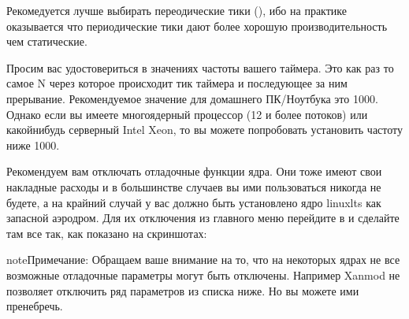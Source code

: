 \documentclass[letterpaper,10pt,russian,openany]{sphinxmanual}
\begin{document}
\sphinxAtStartPar
Рекомедуется лучше выбирать переодические тики (), ибо на практике оказывается что периодические тики
дают более хорошую производительность чем статические.

\sphinxAtStartPar
{}

\noindent{}

\sphinxAtStartPar
{}

\noindent{}

\sphinxAtStartPar
{}

\noindent{}

\sphinxAtStartPar
{}

\noindent{}

\sphinxAtStartPar
{} Просим вас удостовериться в значениях частоты вашего таймера.
Это как раз то самое N через которое происходит тик таймера и последующее за ним прерывание.
Рекомендуемое значение для домашнего ПК/Ноутбука это 1000.
Однако если вы имеете многоядерный процессор (12 и более потоков) или какой\sphinxhyphen{}нибудь серверный Intel Xeon,
то вы можете попробовать установить частоту ниже 1000.

\sphinxAtStartPar
{}

\noindent{}

\sphinxAtStartPar
{}

\noindent{}

\sphinxAtStartPar
{}

\noindent{}

\sphinxAtStartPar
{} Рекомендуем вам отключать отладочные функции ядра. Они тоже имеют свои накладные расходы и в большинстве случаев
вы ими пользоваться никогда не будете, а на крайний случай у вас должно быть установлено ядро linux\sphinxhyphen{}lts как запасной аэродром.
Для их отключения из главного меню перейдите в  и сделайте там все так, как показано на скриншотах:

\begin{sphinxadmonition}{note}{Примечание:}
\sphinxAtStartPar
Обращаем ваше внимание на то, что на некоторых ядрах не все возможные отладочные параметры могут быть отключены.
Например Xanmod не позволяет отключить ряд параметров из списка ниже. Но вы можете ими пренебречь.
\end{sphinxadmonition}
\end{document}
